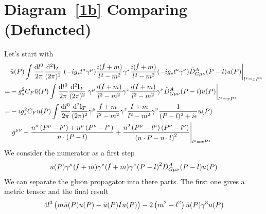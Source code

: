 \documentclass{article}
\DeclarePairedDelimiter\bracketM{[}{]}
\let\bqty\relax
\newcommand{\bqty}[1]{\bracketM*{#1}}
\newcommand{\mmd}[2][d]{\ifthenelse{\equal{#1}{1}}{\frac{\dd {#2}}{2\pi}}{\frac{\dd^{#1}{#2}}{(2\pi)^{#1}}}}
\begin{document}
\clearpage
\section{Diagram~\ref{1b} Comparing (Defuncted)\label{sec:dc1}}
Let's start with
\begin{align}
	  & \bar u(P)\int\mmd[1]{l^0}\mmd[2]{\vb{l}_T}\eval{(-ig_st^a\gamma^{\mu})\frac{i(\slashed{l}+m)}{l^2-m^2}\gamma^z\frac{i(\slashed{l}+m)}{l^2-m^2}(-ig_st^a\gamma^{\nu})\tilde D_{G\mu\nu}^A(P-l)u(P)}_{l^z=xP^z}\notag \\
	= & -g_s^2C_F\bar u(P)\int\mmd[1]{l^0}\mmd[2]{\vb{l}_T}\eval{\gamma^{\mu}\frac{i(\slashed{l}+m)}{l^2-m^2}\gamma^z\frac{i(\slashed{l}+m)}{l^2-m^2}\gamma^{\nu}\tilde D_{G\mu\nu}^A(P-l)u(P)}_{l^z=xP^z}\notag            \\
	= & -ig_s^2C_F\bar u(P)\int\mmd[1]{l^0}\mmd[2]{\vb{l}_T}\gamma^{\mu}\frac{\slashed{l}+m}{l^2-m^2}\gamma^z\frac{\slashed{l}+m}{l^2-m^2}\gamma^{\nu}\frac{1}{(P-l)^2+i\epsilon}u(P)\notag                                 \\&\eval{\bqty{\bar{g}^{\mu \nu }-\frac{n^{\nu } \left(P^{\mu }-l^{\mu }\right)+n^{\mu} \left(P^{\nu }-l^{\nu }\right)}{n\cdot (P-l)}+\frac{n^2 \left(P^{\mu }-l^{\mu }\right) \left(P^{\nu }-l^{\nu }\right)}{\left(n\cdot P-n\cdot l\right)^2}}}_{l^z=xP^z}
\end{align}
We consider the numerator as a first step
\begin{align}
	\bar u(P)\gamma^{\mu}(\slashed{l}+m)\gamma^z(\slashed{l}+m)\gamma^{\nu}\bqty{\pqty{P-l}^2\tilde D_{G\mu\nu}^A(P-l)}u(P)
\end{align}
We can separate the gluon propagator into there parts. The first one gives a metric tensor and the final result
\begin{align}
	4 l^3 \left(m \bar{u}(P) u(P)-\bar{u}(P) \slashed{l} u(P)\right)-2 \left(m^2-l^2\right) \bar{u}(P) \gamma^3 u(P)
\end{align}
\end{document}
